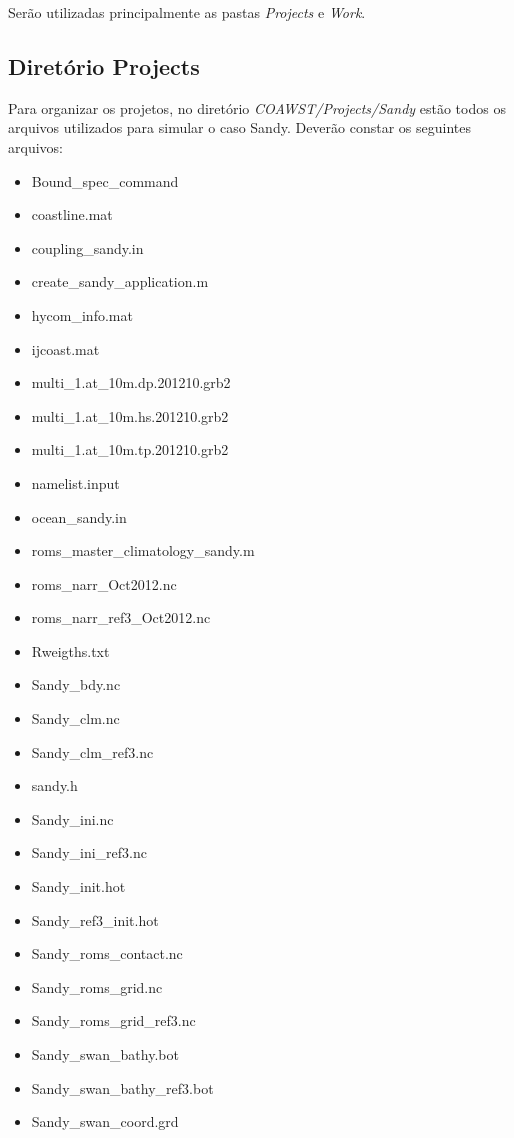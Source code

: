 \noindent Serão utilizadas principalmente as pastas \textit{Projects} e \textit{Work}.

\subsection{Diretório Projects}
\bigskip

\noindent Para organizar os projetos, no diretório \textit{COAWST/Projects/Sandy} estão todos os arquivos utilizados para simular o
          caso Sandy. Deverão constar os seguintes arquivos:
\bigskip

\begin{itemize}
\item Bound\_spec\_command
\item coastline.mat
\item coupling\_sandy.in
\item create\_sandy\_application.m
\item hycom\_info.mat
\item ijcoast.mat
\item multi\_1.at\_10m.dp.201210.grb2
\item multi\_1.at\_10m.hs.201210.grb2
\item multi\_1.at\_10m.tp.201210.grb2
\item namelist.input
\item ocean\_sandy.in
\item roms\_master\_climatology\_sandy.m
\item roms\_narr\_Oct2012.nc
\item roms\_narr\_ref3\_Oct2012.nc
\item Rweigths.txt
\item Sandy\_bdy.nc
\item Sandy\_clm.nc
\item Sandy\_clm\_ref3.nc
\item sandy.h
\item Sandy\_ini.nc
\item Sandy\_ini\_ref3.nc
\item Sandy\_init.hot
\item Sandy\_ref3\_init.hot
\item Sandy\_roms\_contact.nc
\item Sandy\_roms\_grid.nc
\item Sandy\_roms\_grid\_ref3.nc
\item Sandy\_swan\_bathy.bot
\item Sandy\_swan\_bathy\_ref3.bot
\item Sandy\_swan\_coord.grd

\end{itemize}
